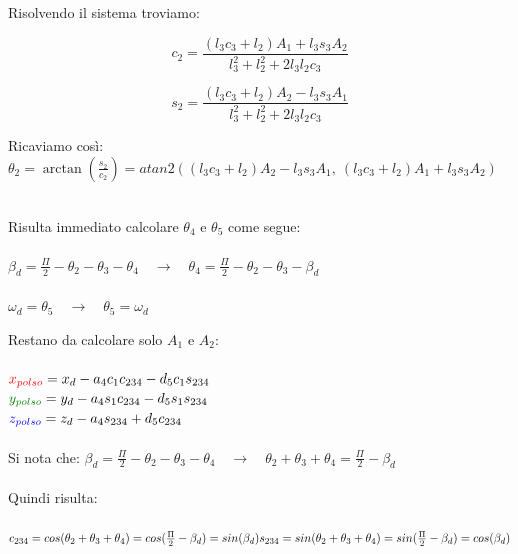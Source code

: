 \documentclass[a4paper]{article}
\begin{document}
    \begin{text}
        Risolvendo il sistema troviamo:
    \end{text}
    
    \[
    c_2 = \frac{(l_3 c_3 + l_2) A_1 + l_3 s_3 A_2}{l_3^2 + l_2^2 + 2 l_3 l_2 c_3}
    \]
    
    \[
    s_2 = \frac{(l_3 c_3 + l_2) A_2 - l_3 s_3 A_1}{l_3^2 + l_2^2 + 2 l_3 l_2 c_3}
    \]
    
    \begin{text}
        Ricaviamo così: \quad $\theta_2 = \arctan (\frac{s_2}{c_2}) = atan2((l_3 c_3 + l_2) A_2 - l_3 s_3 A_1, \ (l_3 c_3 + l_2) A_1 + l_3 s_3 A_2)$ \\ \\
    \end{text}
    
    \begin{text}
        Risulta immediato calcolare $\theta_4$ e $\theta_5$ come segue:\\ \\
        $\beta_d = \frac{\Pi}{2}-\theta_2-\theta_3-\theta_4 \quad \rightarrow \quad \theta_4 = \frac{\Pi}{2}-\theta_2-\theta_3-\beta_d$ \\ \\
        $\omega_d = \theta_5 \quad \rightarrow \quad \theta_5 = \omega_d$ \\
    \end{text}
    
    \begin{text}
        Restano da calcolare solo $A_1$ e $A_2$: \\ \\
        $\textcolor{red}{x_{polso}} = x_d - a_4 c_1 c_{234} - d_5 c_1 s_{234} $ \\
        $\textcolor[rgb]{0.004, 0.5, 0.004}{y_{polso}} = y_d - a_4 s_1 c_{234} - d_5 s_1 s_{234}$ \\
        $\textcolor{blue}{z_{polso}} = z_d - a_4 s_{234} + d_5 c_{234}$ \\ \\
        Si nota che: $\beta_d = \frac{\Pi}{2}-\theta_2-\theta_3-\theta_4 \quad \rightarrow \quad \theta_2 + \theta_3 + \theta_4 = \frac{\Pi}{2}-\beta_d$ \\ \\
        Quindi risulta: \\ \\
        $c_{234} = cos(\theta_2 + \theta_3 + \theta_4) = cos(\frac{\Pi}{2}-\beta_d) = sin(\beta_d) \\
        s_{234} = sin(\theta_2 + \theta_3 + \theta_4) = sin(\frac{\Pi}{2}-\beta_d) = cos(\beta_d)$ \\
    \end{text}
    
\end{document}
